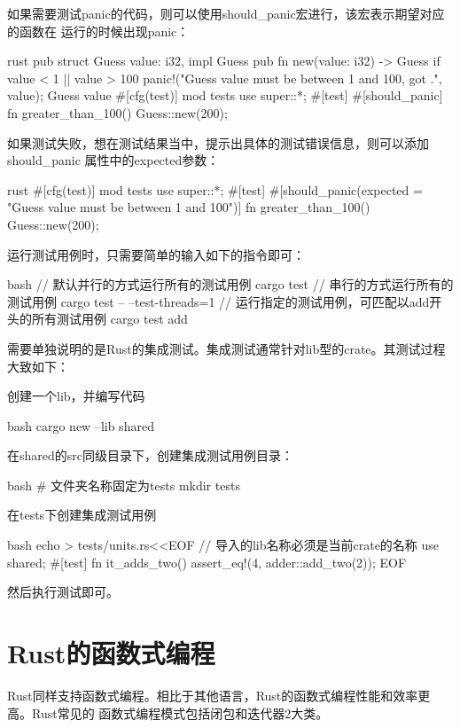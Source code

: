 如果需要测试panic的代码，则可以使用should\_panic宏进行，该宏表示期望对应的函数在
运行的时候出现panic：
\begin{code-block}{rust}
pub struct Guess {
    value: i32,
}
impl Guess {
    pub fn new(value: i32) -> Guess {
        if value < 1 || value > 100 {
            panic!("Guess value must be between 1 and 100, got {}.", value);
        }
        Guess {
            value
        }
    }
}
#[cfg(test)]
mod tests {
    use super::*;
    #[test]
    #[should_panic]
    fn greater_than_100() {
        Guess::new(200);
    }
}
\end{code-block}
如果测试失败，想在测试结果当中，提示出具体的测试错误信息，则可以添加should\_panic
属性中的expected参数：
\begin{code-block}{rust}
#[cfg(test)]
mod tests {
    use super::*;
    #[test]
    #[should_panic(expected = "Guess value must be between 1 and 100")]
    fn greater_than_100() {
        Guess::new(200);
    }
}
\end{code-block}

运行测试用例时，只需要简单的输入如下的指令即可：
\begin{code-block}{bash}
// 默认并行的方式运行所有的测试用例
cargo test
// 串行的方式运行所有的测试用例
cargo test -- --test-threads=1
// 运行指定的测试用例，可匹配以add开头的所有测试用例
cargo test add
\end{code-block}

需要单独说明的是Rust的集成测试。集成测试通常针对lib型的crate。其测试过程大致如下：
\begin{outline}[enumerate]
\1 创建一个lib，并编写代码

\begin{code-block}{bash}
cargo new --lib shared
\end{code-block}

\1 在shared的src同级目录下，创建集成测试用例目录：
\begin{code-block}{bash}
# 文件夹名称固定为tests
mkdir tests
\end{code-block}

\1 在tests下创建集成测试用例
\begin{code-block}{bash}
echo > tests/units.rs<<EOF
// 导入的lib名称必须是当前crate的名称
use shared;
#[test]
fn it_adds_two() {
    assert_eq!(4, adder::add_two(2));
}
EOF
\end{code-block}
然后执行测试即可。
\end{outline}

\section{Rust的函数式编程}
Rust同样支持函数式编程。相比于其他语言，Rust的函数式编程性能和效率更高。Rust常见的
函数式编程模式包括闭包和迭代器2大类。

